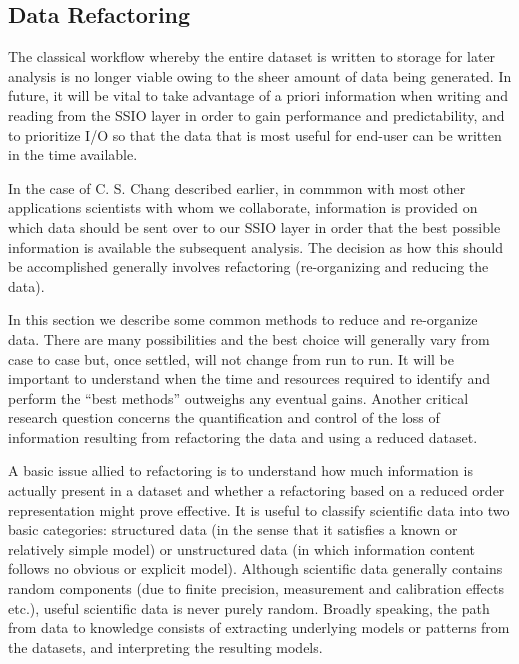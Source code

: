 \subsection{Data Refactoring} \label{sec:data-refactor} 

The classical workflow whereby the entire dataset is written to storage for
later analysis is no longer viable owing to the sheer amount of data being
generated. In future, it will be vital to take advantage of a priori
information when writing and reading from the SSIO layer in order to gain
performance and predictability, and to prioritize I/O so that the data that
is most useful for end-user can be written in the time available. 

In the case of C. S. Chang described earlier, in commmon with most other
applications scientists with whom we collaborate, information is provided on
which data should be sent over to our SSIO layer in order that the best
possible information is available the subsequent analysis. The decision as how
this should be accomplished generally involves refactoring (re-organizing and
reducing the data). 

In this section we describe some common methods to reduce and re-organize data.
There are many possibilities and the best choice will generally vary from case
to case but, once settled, will not change from run to run. It will be
important to understand when the time and resources required to identify and
perform the ``best methods'' outweighs any eventual gains. Another critical
research question concerns the quantification and control of the loss of
information resulting from refactoring the data and using a reduced 
dataset. 

A basic issue allied to refactoring is to understand how much information is
actually present in a dataset and whether a refactoring based on a reduced
order representation might prove effective. It is useful to classify scientific
data into two basic categories: structured data (in the sense that it satisfies
a known or relatively simple model) or unstructured data (in which information
content follows no obvious or explicit model).  Although scientific data
generally contains random components (due to finite precision, measurement and
calibration effects etc.), useful scientific data is never purely random.
Broadly speaking, the path from data to knowledge consists of extracting
underlying models or patterns from the datasets, and interpreting the resulting
models. 

